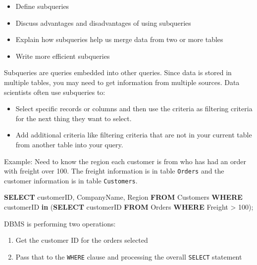 \documentclass[]{book}
\newenvironment{Shaded}{\begin{snugshade}}{\end{snugshade}}
\newcommand{\KeywordTok}[1]{\textcolor[rgb]{0.13,0.29,0.53}{\textbf{{#1}}}}
\newcommand{\DecValTok}[1]{\textcolor[rgb]{0.00,0.00,0.81}{{#1}}}
\newcommand{\NormalTok}[1]{{#1}}
\providecommand{\tightlist}{%
  \setlength{\itemsep}{0pt}\setlength{\parskip}{0pt}}
\theoremstyle{definition}
\theoremstyle{definition}
\theoremstyle{remark}
\begin{document}
\begin{itemize}
\tightlist
\item
  Define subqueries
\item
  Discuss advantages and disadvantages of using subqueries
\item
  Explain how subqueries help us merge data from two or more tables
\item
  Write more efficient subqueries
\end{itemize}

Subqueries are queries embedded into other queries. Since data is stored
in multiple tables, you may need to get information from multiple
sources. Data scientists often use subqueries to:

\begin{itemize}
\tightlist
\item
  Select specific records or columns and then use the criteria as
  filtering criteria for the next thing they want to select.
\item
  Add additional criteria like filtering criteria that are not in your
  current table from another table into your query.
\end{itemize}

Example: Need to know the region each customer is from who has had an
order with freight over 100. The freight information is in table
\texttt{Orders} and the customer information is in table
\texttt{Customers}.

\begin{Shaded}
\begin{Highlighting}[]
\KeywordTok{SELECT} \NormalTok{customerID, CompanyName, Region}
\KeywordTok{FROM} \NormalTok{Customers}
\KeywordTok{WHERE} \NormalTok{customerID }\KeywordTok{in} \NormalTok{(}\KeywordTok{SELECT} \NormalTok{customerID }\KeywordTok{FROM} \NormalTok{Orders }\KeywordTok{WHERE} \NormalTok{Freight > }\DecValTok{100}\NormalTok{);}
\end{Highlighting}
\end{Shaded}

DBMS is performing two operations:

\begin{enumerate}
\def\labelenumi{\arabic{enumi}.}
\tightlist
\item
  Get the customer ID for the orders selected
\item
  Pass that to the \texttt{WHERE} clause and processing the overall
  \texttt{SELECT} statement
\end{enumerate}
\end{document}

